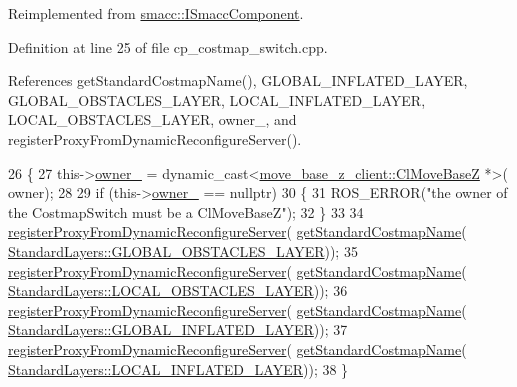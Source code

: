 Reimplemented from \hyperlink{classsmacc_1_1ISmaccComponent_a3378552cb1a86aa26a07c0edc057448b}{smacc\+::\+I\+Smacc\+Component}.



Definition at line 25 of file cp\+\_\+costmap\+\_\+switch.\+cpp.



References get\+Standard\+Costmap\+Name(), G\+L\+O\+B\+A\+L\+\_\+\+I\+N\+F\+L\+A\+T\+E\+D\+\_\+\+L\+A\+Y\+ER, G\+L\+O\+B\+A\+L\+\_\+\+O\+B\+S\+T\+A\+C\+L\+E\+S\+\_\+\+L\+A\+Y\+ER, L\+O\+C\+A\+L\+\_\+\+I\+N\+F\+L\+A\+T\+E\+D\+\_\+\+L\+A\+Y\+ER, L\+O\+C\+A\+L\+\_\+\+O\+B\+S\+T\+A\+C\+L\+E\+S\+\_\+\+L\+A\+Y\+ER, owner\+\_\+, and register\+Proxy\+From\+Dynamic\+Reconfigure\+Server().


\begin{DoxyCode}
26 \{
27     this->\hyperlink{classmove__base__z__client_1_1CostmapSwitch_a00517c28045327007d7b9335c9b433ed}{owner\_} = \textcolor{keyword}{dynamic\_cast<}\hyperlink{classmove__base__z__client_1_1ClMoveBaseZ}{move\_base\_z\_client::ClMoveBaseZ} *\textcolor{keyword}{>}(
      owner);
28 
29     \textcolor{keywordflow}{if} (this->\hyperlink{classmove__base__z__client_1_1CostmapSwitch_a00517c28045327007d7b9335c9b433ed}{owner\_} == \textcolor{keyword}{nullptr})
30     \{
31         ROS\_ERROR(\textcolor{stringliteral}{"the owner of the CostmapSwitch must be a ClMoveBaseZ"});
32     \}
33 
34     \hyperlink{classmove__base__z__client_1_1CostmapSwitch_a0282cb1651dd50803e3af0de1436635f}{registerProxyFromDynamicReconfigureServer}(
      \hyperlink{classmove__base__z__client_1_1CostmapSwitch_ae8635d58b81be774e18eb4afa99413e1}{getStandardCostmapName}(
      \hyperlink{classmove__base__z__client_1_1CostmapSwitch_a810338d2ba3fe25fc4ecf8c6c85b462ba94404229e09ab748aab0096bd5ff3656}{StandardLayers::GLOBAL\_OBSTACLES\_LAYER}));
35     \hyperlink{classmove__base__z__client_1_1CostmapSwitch_a0282cb1651dd50803e3af0de1436635f}{registerProxyFromDynamicReconfigureServer}(
      \hyperlink{classmove__base__z__client_1_1CostmapSwitch_ae8635d58b81be774e18eb4afa99413e1}{getStandardCostmapName}(
      \hyperlink{classmove__base__z__client_1_1CostmapSwitch_a810338d2ba3fe25fc4ecf8c6c85b462baff8d30cf6ceac8551691e28c328aebe6}{StandardLayers::LOCAL\_OBSTACLES\_LAYER}));
36     \hyperlink{classmove__base__z__client_1_1CostmapSwitch_a0282cb1651dd50803e3af0de1436635f}{registerProxyFromDynamicReconfigureServer}(
      \hyperlink{classmove__base__z__client_1_1CostmapSwitch_ae8635d58b81be774e18eb4afa99413e1}{getStandardCostmapName}(
      \hyperlink{classmove__base__z__client_1_1CostmapSwitch_a810338d2ba3fe25fc4ecf8c6c85b462ba1757575ee674622adfb325de182a65d6}{StandardLayers::GLOBAL\_INFLATED\_LAYER}));
37     \hyperlink{classmove__base__z__client_1_1CostmapSwitch_a0282cb1651dd50803e3af0de1436635f}{registerProxyFromDynamicReconfigureServer}(
      \hyperlink{classmove__base__z__client_1_1CostmapSwitch_ae8635d58b81be774e18eb4afa99413e1}{getStandardCostmapName}(
      \hyperlink{classmove__base__z__client_1_1CostmapSwitch_a810338d2ba3fe25fc4ecf8c6c85b462baab9e94e9dc4c62e74e48ee34b11c8807}{StandardLayers::LOCAL\_INFLATED\_LAYER}));
38 \}
\end{DoxyCode}

